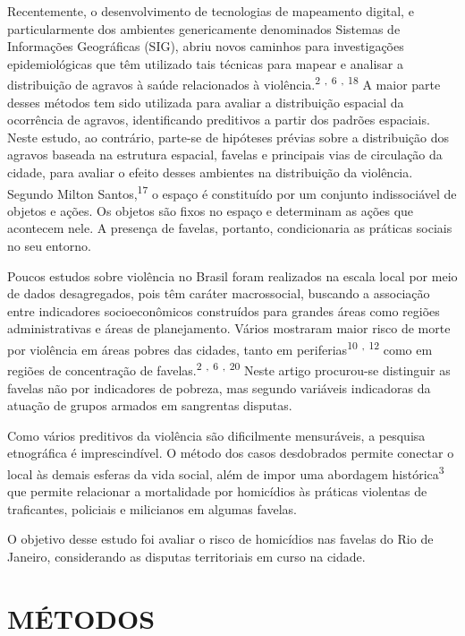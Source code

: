 \documentclass{article}
\begin{document}
Recentemente, o desenvolvimento de tecnologias de mapeamento digital, e
particularmente dos ambientes genericamente denominados Sistemas de Informações
Geográficas (SIG), abriu novos caminhos para investigações epidemiológicas que
têm utilizado tais técnicas para mapear e analisar a distribuição de agravos à
saúde relacionados à violência.\textsuperscript{2}
\textsuperscript{,}
\textsuperscript{6}
\textsuperscript{,}
\textsuperscript{18}
A maior parte desses métodos tem sido utilizada para avaliar a distribuição
espacial da ocorrência de agravos, identificando preditivos a partir dos padrões
espaciais. Neste estudo, ao contrário, parte-se de hipóteses prévias sobre a
distribuição dos agravos baseada na estrutura espacial, favelas e principais
vias de circulação da cidade, para avaliar o efeito desses ambientes na
distribuição da violência. Segundo Milton Santos,\textsuperscript{17}
o espaço é constituído por um conjunto indissociável de objetos e ações. Os
objetos são fixos no espaço e determinam as ações que acontecem nele. A presença
de favelas, portanto, condicionaria as práticas sociais no seu entorno.

Poucos estudos sobre violência no Brasil foram realizados na escala local por
meio de dados desagregados, pois têm caráter macrossocial, buscando a associação
entre indicadores socioeconômicos construídos para grandes áreas como regiões
administrativas e áreas de planejamento. Vários mostraram maior risco de morte
por violência em áreas pobres das cidades, tanto em
periferias\textsuperscript{10}
\textsuperscript{,}
\textsuperscript{12}
como em regiões de concentração de favelas.\textsuperscript{2}
\textsuperscript{,}
\textsuperscript{6}
\textsuperscript{,}
\textsuperscript{20}
Neste artigo procurou-se distinguir as favelas não por indicadores de pobreza,
mas segundo variáveis indicadoras da atuação de grupos armados em sangrentas
disputas.

Como vários preditivos da violência são dificilmente mensuráveis, a pesquisa
etnográfica é imprescindível. O método dos casos desdobrados permite conectar o
local às demais esferas da vida social, além de impor uma abordagem
histórica\textsuperscript{3}
que permite relacionar a mortalidade por homicídios às práticas violentas de
traficantes, policiais e milicianos em algumas favelas.

O objetivo desse estudo foi avaliar o risco de homicídios nas favelas do Rio de
Janeiro, considerando as disputas territoriais em curso na cidade.

\section{MÉTODOS}
\end{document}
